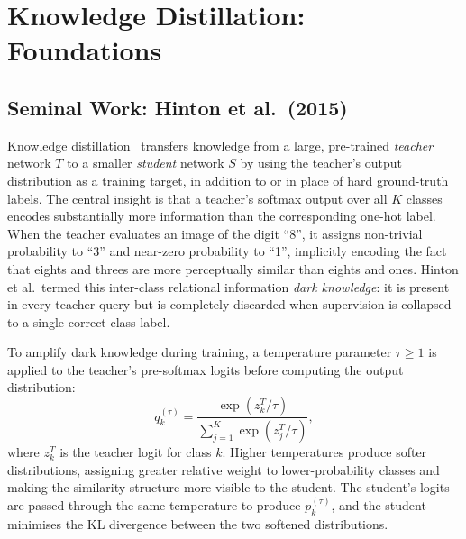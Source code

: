 \section{Knowledge Distillation: Foundations} \label{sec:23-background-kdfoundations}

\subsection{Seminal Work: Hinton et al.\ (2015)}
\label{sec:23-background-kdfoundations-hinton}

\begin{foldable}
  Knowledge distillation~\cite{hinton2015distilling} transfers knowledge from a large, pre-trained \emph{teacher} network $T$ to a smaller \emph{student} network $S$ by using the teacher's output distribution as a training target, in addition to or in place of hard ground-truth labels.
  The central insight is that a teacher's softmax output over all $K$ classes encodes substantially more information than the corresponding one-hot label.
  When the teacher evaluates an image of the digit ``8'', it assigns non-trivial probability to ``3'' and near-zero probability to ``1'', implicitly encoding the fact that eights and threes are more perceptually similar than eights and ones.
  Hinton et al.\ termed this inter-class relational information \emph{dark knowledge}: it is present in every teacher query but is completely discarded when supervision is collapsed to a single correct-class label.
\end{foldable}

\begin{foldable}
  To amplify dark knowledge during training, a temperature parameter $\tau \geq 1$ is applied to the teacher's pre-softmax logits before computing the output distribution:
  \begin{equation}
    q_k^{(\tau)} = \frac{\exp(z_k^{T} / \tau)}{\sum_{j=1}^{K} \exp(z_j^{T} / \tau)},
    \label{eq:softmax-temperature}
  \end{equation}
  where $z_k^{T}$ is the teacher logit for class $k$.
  Higher temperatures produce softer distributions, assigning greater relative weight to lower-probability classes and making the similarity structure more visible to the student.
  The student's logits are passed through the same temperature to produce $p_k^{(\tau)}$, and the student minimises the KL divergence between the two softened distributions.
\end{foldable}

